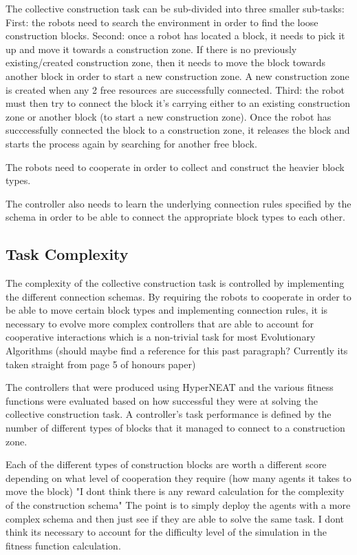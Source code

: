 The collective construction task can be sub-divided into three smaller sub-tasks:
	First:
		the robots need to search the environment in order to find the loose construction blocks.
	Second:
		once a robot has located a block, it needs to pick it up and move it towards a construction zone. If there is no previously existing/created construction zone, then it needs to move the block towards another block in order to start a new construction zone. A new construction zone is created when any 2 free resources are successfully connected.
	Third:
		the robot must then try to connect the block it's carrying either to an existing construction zone or another block (to start a new construction zone). Once the robot has succcessfully connected the block to a construction zone, it releases the block and starts the process again by searching for another free block.

The robots need to cooperate in order to collect and construct the heavier block types.

The controller also needs to learn the underlying connection rules specified by the schema in order to be able to connect the appropriate block types to each other.




\subsection{Task Complexity}

The complexity of the collective construction task is controlled by implementing the different connection schemas. By requiring the robots to cooperate in order to be able to move certain block types and implementing connection rules, it is necessary to evolve more complex controllers that are able to account for cooperative interactions which is a non-trivial task for most Evolutionary Algorithms (should maybe find a reference for this past paragraph? Currently its taken straight from page 5 of honours paper)

The controllers that were produced using HyperNEAT and the various fitness functions were evaluated based on how successful they were at solving the collective construction task. A controller's task performance is defined by the number of different types of blocks that it managed to connect to a construction zone.

Each of the different types of construction blocks are worth a different score depending on what level of cooperation they require (how many agents it takes to move the block)
"I dont think there is any reward calculation for the complexity of the construction schema" The point is to simply deploy the agents with a more complex schema and then just see if they are able to solve the same task. I dont think its necessary to account for the difficulty level of the simulation in the fitness function calculation.

